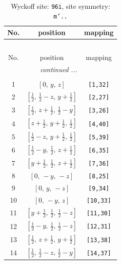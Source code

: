 \documentclass[fleqn,8pt]{jsarticle}
\begin{document}
\begin{longtable}{ccc}
\caption{Wyckoff site: {\tt 96i}, site symmetry: {\tt m'..}}
 \\
 \hline \hline
No. & position & mapping \\ \hline \endfirsthead

\multicolumn{2}{l}{\tablename\ \thetable{}} \\
 \hline \hline
No. & position & mapping \\ \hline \endhead

 \hline \hline
\multicolumn{2}{r}{\footnotesize\it continued ...} \\ \endfoot

 \hline \hline
\multicolumn{2}{r}{} \\ \endlastfoot

1 & $\left[ 0,\, y,\, z \right]$ & {\tt [1,32]} \\ \hline
2 & $\left[ \frac{1}{2},\, \frac{1}{2} - z,\, y + \frac{1}{2} \right]$ & {\tt [2,27]} \\ \hline
3 & $\left[ \frac{1}{2},\, z + \frac{1}{2},\, \frac{1}{2} - y \right]$ & {\tt [3,26]} \\ \hline
4 & $\left[ z + \frac{1}{2},\, y + \frac{1}{2},\, \frac{1}{2} \right]$ & {\tt [4,40]} \\ \hline
5 & $\left[ \frac{1}{2} - z,\, y + \frac{1}{2},\, \frac{1}{2} \right]$ & {\tt [5,39]} \\ \hline
6 & $\left[ \frac{1}{2} - y,\, \frac{1}{2},\, z + \frac{1}{2} \right]$ & {\tt [6,35]} \\ \hline
7 & $\left[ y + \frac{1}{2},\, \frac{1}{2},\, z + \frac{1}{2} \right]$ & {\tt [7,36]} \\ \hline
8 & $\left[ 0,\, - y,\, - z \right]$ & {\tt [8,25]} \\ \hline
9 & $\left[ 0,\, y,\, - z \right]$ & {\tt [9,34]} \\ \hline
10 & $\left[ 0,\, - y,\, z \right]$ & {\tt [10,33]} \\ \hline
11 & $\left[ y + \frac{1}{2},\, \frac{1}{2},\, \frac{1}{2} - z \right]$ & {\tt [11,30]} \\ \hline
12 & $\left[ \frac{1}{2} - y,\, \frac{1}{2},\, \frac{1}{2} - z \right]$ & {\tt [12,31]} \\ \hline
13 & $\left[ \frac{1}{2},\, z + \frac{1}{2},\, y + \frac{1}{2} \right]$ & {\tt [13,38]} \\ \hline
14 & $\left[ \frac{1}{2},\, \frac{1}{2} - z,\, \frac{1}{2} - y \right]$ & {\tt [14,37]} \\ \hline

\end{longtable}
\end{document}
